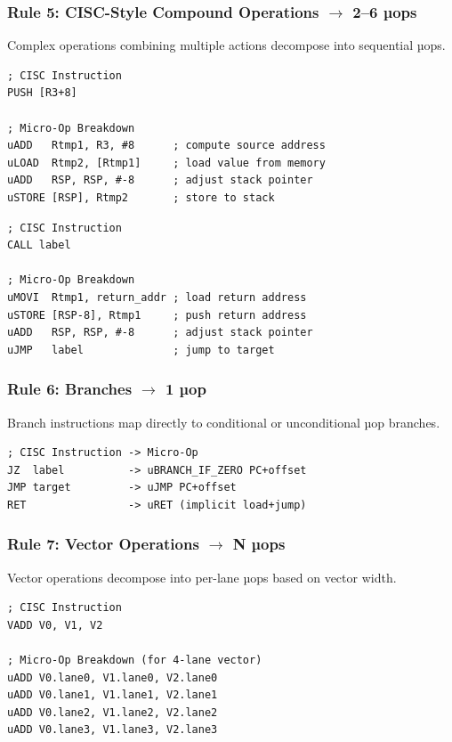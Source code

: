 \documentclass[12pt]{article}
\begin{document}
\subsubsection{Rule 5: CISC-Style Compound Operations $\rightarrow$ 2--6 µops}

Complex operations combining multiple actions decompose into sequential µops.

\begin{lstlisting}
; CISC Instruction
PUSH [R3+8]

; Micro-Op Breakdown
uADD   Rtmp1, R3, #8      ; compute source address
uLOAD  Rtmp2, [Rtmp1]     ; load value from memory
uADD   RSP, RSP, #-8      ; adjust stack pointer
uSTORE [RSP], Rtmp2       ; store to stack
\end{lstlisting}

\begin{lstlisting}
; CISC Instruction
CALL label

; Micro-Op Breakdown
uMOVI  Rtmp1, return_addr ; load return address
uSTORE [RSP-8], Rtmp1     ; push return address
uADD   RSP, RSP, #-8      ; adjust stack pointer
uJMP   label              ; jump to target
\end{lstlisting}

\subsubsection{Rule 6: Branches $\rightarrow$ 1 µop}

Branch instructions map directly to conditional or unconditional µop branches.

\begin{lstlisting}
; CISC Instruction -> Micro-Op
JZ  label          -> uBRANCH_IF_ZERO PC+offset
JMP target         -> uJMP PC+offset
RET                -> uRET (implicit load+jump)
\end{lstlisting}

\subsubsection{Rule 7: Vector Operations $\rightarrow$ N µops}

Vector operations decompose into per-lane µops based on vector width.

\begin{lstlisting}
; CISC Instruction
VADD V0, V1, V2

; Micro-Op Breakdown (for 4-lane vector)
uADD V0.lane0, V1.lane0, V2.lane0
uADD V0.lane1, V1.lane1, V2.lane1
uADD V0.lane2, V1.lane2, V2.lane2
uADD V0.lane3, V1.lane3, V2.lane3
\end{lstlisting}
\end{document}
